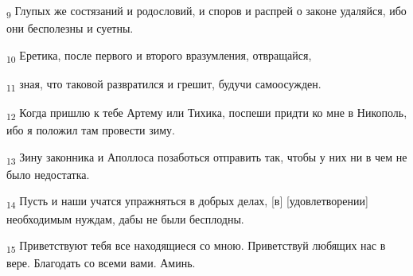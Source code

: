 \begin{tcolorbox}
\textsubscript{9} Глупых же состязаний и родословий, и споров и распрей о законе удаляйся, ибо они бесполезны и суетны.
\end{tcolorbox}
\begin{tcolorbox}
\textsubscript{10} Еретика, после первого и второго вразумления, отвращайся,
\end{tcolorbox}
\begin{tcolorbox}
\textsubscript{11} зная, что таковой развратился и грешит, будучи самоосужден.
\end{tcolorbox}
\begin{tcolorbox}
\textsubscript{12} Когда пришлю к тебе Артему или Тихика, поспеши придти ко мне в Никополь, ибо я положил там провести зиму.
\end{tcolorbox}
\begin{tcolorbox}
\textsubscript{13} Зину законника и Аполлоса позаботься отправить так, чтобы у них ни в чем не было недостатка.
\end{tcolorbox}
\begin{tcolorbox}
\textsubscript{14} Пусть и наши учатся упражняться в добрых делах, [в] [удовлетворении] необходимым нуждам, дабы не были бесплодны.
\end{tcolorbox}
\begin{tcolorbox}
\textsubscript{15} Приветствуют тебя все находящиеся со мною. Приветствуй любящих нас в вере. Благодать со всеми вами. Аминь.
\end{tcolorbox}
